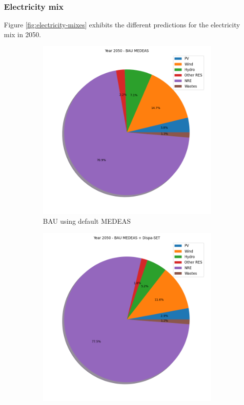 \subsubsection{Electricity mix}

Figure \ref{fig:electricity-mixes} exhibits the different predictions for the electricity mix in 2050.

\begin{figure}[h]
    \centering
    \begin{subfigure}{0.34\textwidth}
        \includegraphics[width=\textwidth]{resources/images/electricity-mix-BAU-default.png}
        \caption{BAU using default MEDEAS}
        \label{fig:electricity-mix-BAU-def}
    \end{subfigure}
    \begin{subfigure}{0.34\textwidth}
        \includegraphics[width=\textwidth]{resources/images/electricity-mix-BAU-dispa.png}

\end{subfigure}
\end{figure}
